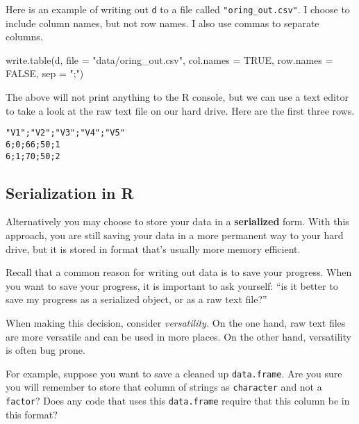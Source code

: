 \documentclass[
  12pt,
  krantz2]{krantz}
\makeatletter
\newenvironment{Shaded}{\begin{snugshade}}{\end{snugshade}}
\newcommand{\AttributeTok}[1]{\textcolor[rgb]{0.61,0.61,0.61}{#1}}
\newcommand{\ConstantTok}[1]{\textcolor[rgb]{0,0,0}{#1}}
\newcommand{\FunctionTok}[1]{\textcolor[rgb]{0,0,0}{#1}}
\newcommand{\NormalTok}[1]{#1}
\newcommand{\StringTok}[1]{\textcolor[rgb]{0.5,0.5,0.5}{#1}}
\newenvironment{kframe}{%
\medskip{}
\setlength{\fboxsep}{.8em}
 \def\at@end@of@kframe{}%
 \ifinner\ifhmode%
  \def\at@end@of@kframe{\end{minipage}}%
  \begin{minipage}{\columnwidth}%
 \fi\fi%
 \def\FrameCommand##1{\hskip\@totalleftmargin \hskip-\fboxsep
 \colorbox{shadecolor}{##1}\hskip-\fboxsep
     \hskip-\linewidth \hskip-\@totalleftmargin \hskip\columnwidth}%
 \MakeFramed {\advance\hsize-\width
   \@totalleftmargin\z@ \linewidth\hsize
   \@setminipage}}%
 {\par\unskip\endMakeFramed%
 \at@end@of@kframe}
\renewenvironment{Shaded}{\begin{kframe}}{\end{kframe}}
\makeatother
\begin{document}
Here is an example of writing out \texttt{d} to a file called \texttt{"oring\_out.csv"}. I choose to include column names, but not row names. I also use commas to separate columns.

\begin{Shaded}
\begin{Highlighting}[]
\FunctionTok{write.table}\NormalTok{(d, }\AttributeTok{file =} \StringTok{"data/oring\_out.csv"}\NormalTok{, }
            \AttributeTok{col.names =} \ConstantTok{TRUE}\NormalTok{, }\AttributeTok{row.names =} \ConstantTok{FALSE}\NormalTok{, }\AttributeTok{sep =} \StringTok{";"}\NormalTok{)}
\end{Highlighting}
\end{Shaded}

The above will not print anything to the R console, but we can use a text editor to take a look at the raw text file on our hard drive. Here are the first three rows.

\begin{verbatim}
"V1";"V2";"V3";"V4";"V5"
6;0;66;50;1
6;1;70;50;2
\end{verbatim}

\hypertarget{serialization-in-r}{%
\subsection{Serialization in R}\label{serialization-in-r}}

Alternatively you may choose to store your data in a \textbf{serialized} form. With this approach, you are still saving your data in a more permanent way to your hard drive, but it is stored in format that's usually more memory efficient.

\begin{rmd-details}
Recall that a common reason for writing out data is to save your progress. When you want to save your progress, it is important to ask yourself: ``is it better to save my progress as a serialized object, or as a raw text file?''

When making this decision, consider \emph{versatility.} On the one hand, raw text files are more versatile and can be used in more places. On the other hand, versatility is often bug prone.

For example, suppose you want to save a cleaned up \texttt{data.frame}. Are you sure you will remember to store that column of strings as \texttt{character} and not a \texttt{factor}? Does any code that uses this \texttt{data.frame} require that this column be in this format?

\end{rmd-details}
\end{document}

